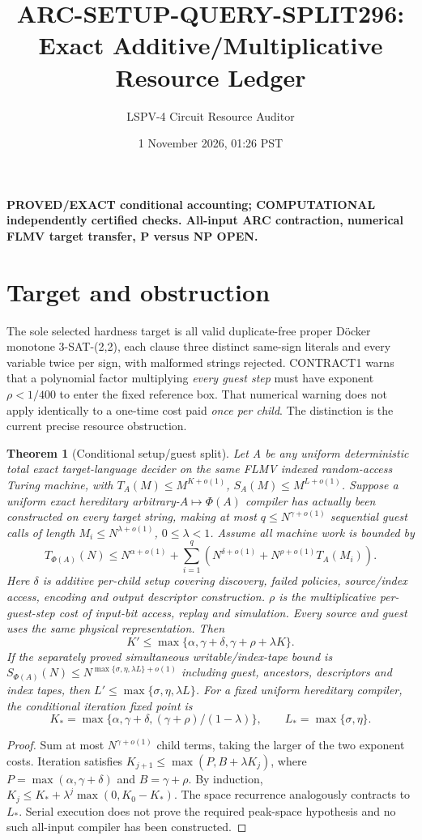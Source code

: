 \documentclass[10pt]{article}
\title{ARC-SETUP-QUERY-SPLIT296: Exact Additive/Multiplicative Resource Ledger}
\author{LSPV-4 Circuit Resource Auditor}\date{1 November 2026, 01:26 PST}
\newtheorem{theorem}{Theorem}
\begin{document}
\maketitle
\noindent\textbf{PROVED/EXACT conditional accounting; COMPUTATIONAL independently certified checks. All-input ARC contraction, numerical FLMV target transfer, P versus NP OPEN.}
\section{Target and obstruction}
The sole selected hardness target is all valid duplicate-free proper D\"ocker monotone 3-SAT-(2,2), each clause three distinct same-sign literals and every variable twice per sign, with malformed strings rejected. CONTRACT1 warns that a polynomial factor multiplying \emph{every guest step} must have exponent $\rho<1/400$ to enter the fixed reference box. That numerical warning does not apply identically to a one-time cost paid \emph{once per child}. The distinction is the current precise resource obstruction.
\begin{theorem}[Conditional setup/guest split]
Let A be any uniform deterministic total exact target-language decider on the same FLMV indexed random-access Turing machine, with $T_A(M)\le M^{K+o(1)}$, $S_A(M)\le M^{L+o(1)}$. Suppose a uniform exact hereditary arbitrary-$A\mapsto\Phi(A)$ compiler has actually been constructed on every target string, making at most $q\le N^{\gamma+o(1)}$ sequential guest calls of length $M_i\le N^{\lambda+o(1)}$, $0\le\lambda<1$. Assume all machine work is bounded by
\[
T_{\Phi(A)}(N)\le N^{\alpha+o(1)}+
\sum_{i=1}^{q}\left(N^{\delta+o(1)}+
N^{\rho+o(1)}T_A(M_i)\right).
\]
Here $\delta$ is additive per-child setup covering discovery, failed policies, source/index access, encoding and output descriptor construction. $\rho$ is the multiplicative per-guest-step cost of input-bit access, replay and simulation. Every source and guest uses the same physical representation. Then
\[
K'\le\max\{\alpha,\gamma+\delta,\gamma+\rho+\lambda K\}.
\]
If the separately \emph{proved} simultaneous writable/index-tape bound is
$S_{\Phi(A)}(N)\le N^{\max\{\sigma,\eta,\lambda L\}+o(1)}$
including guest, ancestors, descriptors and index tapes, then $L'\le\max\{\sigma,\eta,\lambda L\}$.
For a fixed uniform hereditary compiler, the conditional iteration fixed point is
\[
K_*=\max\{\alpha,\gamma+\delta,(\gamma+\rho)/(1-\lambda)\},
\qquad L_*=\max\{\sigma,\eta\}.
\]
\end{theorem}
\begin{proof}
Sum at most $N^{\gamma+o(1)}$ child terms, taking the larger of the two exponent costs. Iteration satisfies $K_{j+1}\le\max(P,B+\lambda K_j)$, where $P=\max(\alpha,\gamma+\delta)$ and $B=\gamma+\rho$. By induction, $K_j\le K_*+\lambda^j\max(0,K_0-K_*)$. The space recurrence analogously contracts to $L_*$. Serial execution does not prove the required peak-space hypothesis and no such all-input compiler has been constructed.
\end{proof}
\end{document}
